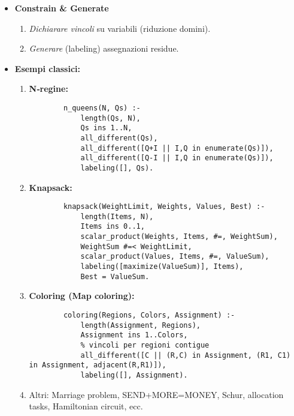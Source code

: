 \documentclass[12pt]{article}
\begin{document}
\begin{itemize}
  \item \textbf{Constrain \& Generate}\\
    \begin{enumerate}
      \item \emph{Dichiarare vincoli} su variabili (riduzione domini).
      \item \emph{Generare} (labeling) assegnazioni residue.
    \end{enumerate}

  \item \textbf{Esempi classici:}\\
    \begin{enumerate}
      \item \textbf{N‐regine:}
        \begin{verbatim}
        n_queens(N, Qs) :-
            length(Qs, N),
            Qs ins 1..N,
            all_different(Qs),
            all_different([Q+I || I,Q in enumerate(Qs)]),
            all_different([Q-I || I,Q in enumerate(Qs)]),
            labeling([], Qs).
        \end{verbatim}

      \item \textbf{Knapsack:}
        \begin{verbatim}
        knapsack(WeightLimit, Weights, Values, Best) :-
            length(Items, N),
            Items ins 0..1,
            scalar_product(Weights, Items, #=, WeightSum),
            WeightSum #=< WeightLimit,
            scalar_product(Values, Items, #=, ValueSum),
            labeling([maximize(ValueSum)], Items),
            Best = ValueSum.
        \end{verbatim}

      \item \textbf{Coloring (Map coloring):}
        \begin{verbatim}
        coloring(Regions, Colors, Assignment) :-
            length(Assignment, Regions),
            Assignment ins 1..Colors,
            % vincoli per regioni contigue
            all_different([C || (R,C) in Assignment, (R1, C1) in Assignment, adjacent(R,R1)]),
            labeling([], Assignment).
        \end{verbatim}

      \item Altri: Marriage problem, SEND+MORE=MONEY, Schur, allocation tasks, Hamiltonian circuit, ecc.
    \end{enumerate}
\end{itemize}
\end{document}
